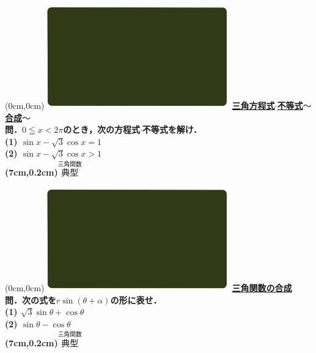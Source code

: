 \documentclass[10pt,
fleqn,
dvipdfmx,
uplatex
]{jsarticle}
\begin{document}
\at(0cm,0cm){\includegraphics[width=8cm,bb=0 0 1920 1080]{./youtube/thumbnails/templates/smart_background/三角関数.jpeg}}
{\color{orange}\bf\boldmath\Large\underline{三角方程式$\cdot$不等式$〜$合成$〜$}}\vspace{0.3zw}\\
\Large 
\bf\boldmath 問．$0\leqq x<2\pi$のとき，次の方程式$\cdot$不等式を解け．\\
(1)  $\sin x-\sqrt 3\cos x=1$\\
(2)  $\sin x-\sqrt 3\cos x>1$\\

\at(7cm,0.2cm){\small\color{bradorange}$\overset{\text{三角関数}}{\text{典型}}$}

\newpage

\at(0cm,0cm){\includegraphics[width=8cm,bb=0 0 1920 1080]{./youtube/thumbnails/templates/smart_background/三角関数.jpeg}}
{\color{orange}\bf\boldmath\LARGE\underline{三角関数の合成}}\vspace{0.3zw}\\
\Large 
\bf\boldmath 問．次の式を$r\sin \left(\theta +\alpha \right)$の形に表せ．\\
(1)  $\sqrt 3\sin \theta +\cos \theta$\\
(2)  $\sin \theta -\cos \theta$\\

\at(7cm,0.2cm){\small\color{bradorange}$\overset{\text{三角関数}}{\text{典型}}$}

\newpage
\end{document}
